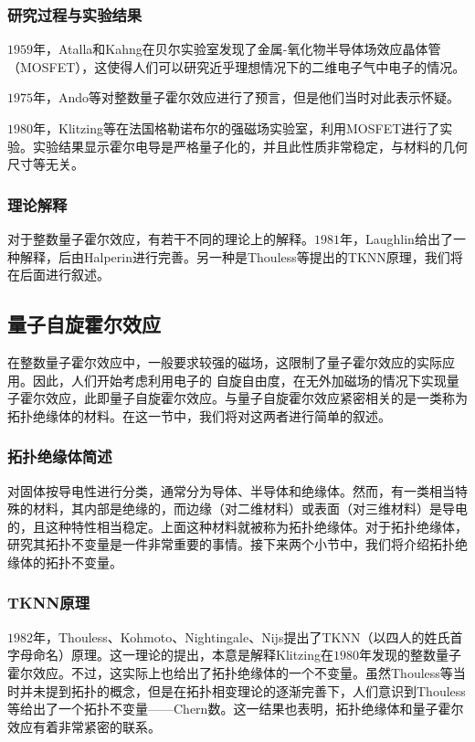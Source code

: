 \subsubsection{研究过程与实验结果}

$1959$年，Atalla和Kahng在贝尔实验室发现了金属-氧化物半导体场效应晶体管（MOSFET），这使得人们可以研究近乎理想情况下的二维电子气中电子的情况。

$1975$年，Ando等对整数量子霍尔效应进行了预言\cite{Ando1975}，但是他们当时对此表示怀疑。

$1980$年，Klitzing等在法国格勒诺布尔的强磁场实验室，利用MOSFET进行了实验。实验结果显示霍尔电导是严格量子化的，并且此性质非常稳定，与材料的几何尺寸等无关。\cite{Klitzing1980}

\subsubsection{理论解释}

对于整数量子霍尔效应，有若干不同的理论上的解释。$1981$年，Laughlin给出了一种解释\cite{Laughlin1981}，后由Halperin进行完善\cite{Halperin1982}。另一种是Thouless等提出的TKNN原理，我们将在后面进行叙述。

\subsection{量子自旋霍尔效应}

在整数量子霍尔效应中，一般要求较强的磁场，这限制了量子霍尔效应的实际应用。因此，人们开始考虑利用电子的
自旋自由度，在无外加磁场的情况下实现量子霍尔效应，此即量子自旋霍尔效应。与量子自旋霍尔效应紧密相关的是一类称为拓扑绝缘体的材料。在这一节中，我们将对这两者进行简单的叙述。

\subsubsection{拓扑绝缘体简述}

对固体按导电性进行分类，通常分为导体、半导体和绝缘体。然而，有一类相当特殊的材料，其内部是绝缘的，而边缘（对二维材料）或表面（对三维材料）是导电的，且这种特性相当稳定。上面这种材料就被称为拓扑绝缘体。对于拓扑绝缘体，研究其拓扑不变量是一件非常重要的事情。接下来两个小节中，我们将介绍拓扑绝缘体的拓扑不变量。

\subsubsection{TKNN原理}

$1982$年，Thouless、Kohmoto、Nightingale、Nijs提出了TKNN（以四人的姓氏首字母命名）原理\cite{Thouless1982}。这一理论的提出，本意是解释Klitzing在$1980$年发现的整数量子霍尔效应。不过，这实际上也给出了拓扑绝缘体的一个不变量。虽然Thouless等当时并未提到拓扑的概念，但是在拓扑相变理论的逐渐完善下，人们意识到Thouless等给出了一个拓扑不变量——Chern数。这一结果也表明，拓扑绝缘体和量子霍尔效应有着非常紧密的联系。

